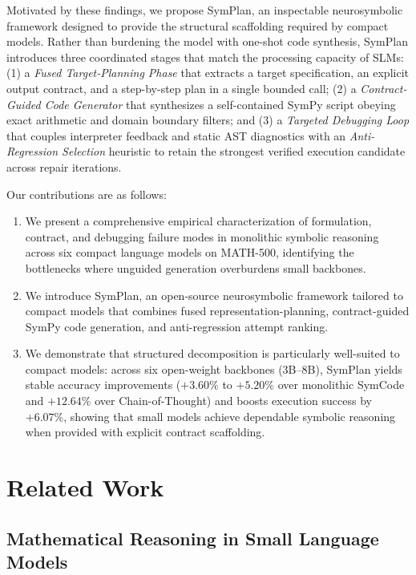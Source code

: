 \documentclass[runningheads]{llncs}
\begin{document}
Motivated by these findings, we propose SymPlan, an inspectable neurosymbolic framework designed to provide the structural scaffolding required by compact models. Rather than burdening the model with one-shot code synthesis, SymPlan introduces three coordinated stages that match the processing capacity of SLMs: (1) a \textit{Fused Target-Planning Phase} that extracts a target specification, an explicit output contract, and a step-by-step plan in a single bounded call; (2) a \textit{Contract-Guided Code Generator} that synthesizes a self-contained SymPy script obeying exact arithmetic and domain boundary filters; and (3) a \textit{Targeted Debugging Loop} that couples interpreter feedback and static AST diagnostics with an \textit{Anti-Regression Selection} heuristic to retain the strongest verified execution candidate across repair iterations.

Our contributions are as follows:
\begin{enumerate}
    \item We present a comprehensive empirical characterization of formulation, contract, and debugging failure modes in monolithic symbolic reasoning across six compact language models on MATH-500, identifying the bottlenecks where unguided generation overburdens small backbones.
    \item We introduce SymPlan, an open-source neurosymbolic framework tailored to compact models that combines fused representation-planning, contract-guided SymPy code generation, and anti-regression attempt ranking.
    \item We demonstrate that structured decomposition is particularly well-suited to compact models: across six open-weight backbones (3B--8B), SymPlan yields stable accuracy improvements ($+3.60\%$ to $+5.20\%$ over monolithic SymCode and $+12.64\%$ over Chain-of-Thought) and boosts execution success by $+6.07\%$, showing that small models achieve dependable symbolic reasoning when provided with explicit contract scaffolding.
\end{enumerate}

\section{Related Work}

\subsection{Mathematical Reasoning in Small Language Models}
\end{document}
